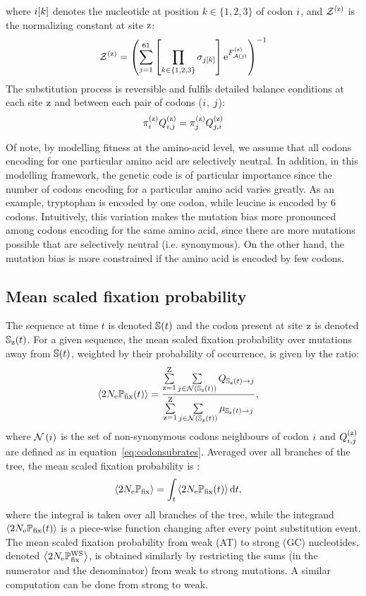 \documentclass{article}
\begin{document}
where ${i}[k]$ denotes the nucleotide at position $k \in \{ 1, 2, 3 \}$ of codon ${i}$, and $\mathcal{Z}^{(\text{z})} $ is the normalizing constant at site $\text{z}$:
\begin{align}
 \mathcal{Z}^{(\text{z})} = \left( \sum\limits_{{j}=1}^{61} \left[\prod\limits_{k \in \{ 1, 2, 3 \}} \sigma_{{j}[k]}\right] \text{e}^{F_{\mathcal{A}({j})}^{(\text{z})}} \right)^{-1}
\end{align}
The {substitution} process is reversible and fulfils detailed balance conditions at each site $\text{z}$ and between each pair of codons (${i}$, ${j}$):
\begin{align}
 \pi_{{i}}^{(\text{z})} Q_{{i}, {j}}^{(\text{z})} = \pi_{{j}}^{(\text{z})} Q_{{j}, {i}}^{(\text{z})}
 \label{codonSubBalance}
\end{align}

Of note, by modelling fitness at the amino-acid level, we assume that all codons encoding for one particular amino acid are selectively {neutral}.
In addition, in this modelling framework, the genetic code is of particular importance since the number of codons encoding for a particular amino acid varies greatly.
As an example, tryptophan is encoded by one codon, while leucine is encoded by 6 codons.
Intuitively, this variation makes the mutation bias more pronounced among codons encoding for the same amino acid, since there are more mutations possible that are selectively {neutral} (i.e. synonymous).
On the other hand, the mutation bias is more constrained if the amino acid is encoded by few codons.

\subsection{Mean scaled fixation probability}
\label{subsec:fixation-bias}
The sequence at time $t$ is denoted $\mathbb{S}(t)$ and the codon present at site $\text{z}$ is denoted $\mathbb{S}_{\text{z}}(t)$.
For a given sequence, the mean scaled fixation probability over mutations away from $\mathbb{S}(t)$, weighted by their probability of occurrence, is given by the ratio:
\begin{align}
 \left\langle 2 N_{\text{e}} \mathbb{P}_{\text{fix}} (t) \right\rangle & = \dfrac{ \sum\limits_{\text{z}=1}^{\text{Z}} \sum\limits_{{j} \in \mathcal{N} \left ( \mathbb{S}_{\text{z}}(t) \right)} Q_{\mathbb{S}_{\text{z}}(t) \to {j}}}{ \sum\limits_{\text{z}=1}^{\text{Z}} \sum\limits_{{j} \in \mathcal{N} \left ( \mathbb{S}_{\text{z}}(t) \right)} \mu_{\mathbb{S}_{\text{z}}(t) \to {j}}},
\end{align}
where $\mathcal{N}\left({i}\right)$ is the set of {non-synonymous} codons neighbours of codon ${i}$ and $Q_{{i}, {j}}^{(\text{z})}$ are defined as in equation~\ref{eq:codonsubrates}.
Averaged over all branches of the tree, the mean scaled fixation probability is :
\begin{align}
 \left\langle 2 N_{\text{e}} \mathbb{P}_{\text{fix}} \right\rangle & = \int_{t} \left\langle 2 N_{\text{e}} \mathbb{P}_{\text{fix}} (t) \right\rangle \mathrm{d} t,
\end{align}
where the integral is taken over all branches of the tree, while the integrand $\left\langle 2 N_{\text{e}} \mathbb{P}_{\text{fix}} (t) \right\rangle$ is a piece-wise function changing after every point {substitution} event.
The mean scaled fixation probability from weak (AT) to strong (GC) nucleotides, denoted $\left\langle 2 N_{\text{e}} \mathbb{P}_{\text{fix}}^{\text{WS}} \right\rangle$, is obtained similarly by restricting the sums (in the numerator and the denominator) from weak to strong mutations.
A similar computation can be done from strong to weak.
\end{document}
